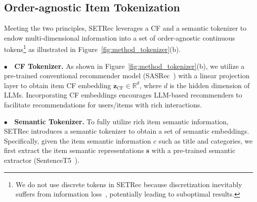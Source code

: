 \subsection{Order-agnostic Item Tokenization} 
Meeting the two principles, SETRec leverages a CF and a semantic tokenizer to endow multi-dimensional information into a set of order-agnostic continuous tokens\footnote{We do not use discrete tokens in SETRec because discretization inevitably suffers from information loss~\cite{lazebnik2008supervised}, potentially leading to suboptimal results.} as illustrated in Figure~\ref{fig:method_tokenizer}(b). 

\noindent$\bullet\quad$\textbf{CF Tokenizer.}
As shown in Figure~\ref{fig:method_tokenizer}(b), we utilize a pre-trained conventional recommender model (\eg SASRec~\cite{lazebnik2008supervised}) with a linear projection layer to obtain item CF embedding $\bm{z}_{\text{CF}}\in\mathbb{R}^{d}$, where $d$ is the hidden dimension of LLMs. 
Incorporating CF embeddings encourages LLM-based recommenders to facilitate recommendations for users/items with rich interactions. 

\noindent$\bullet\quad$\textbf{Semantic Tokenizer.} 
To fully utilize rich item semantic information, SETRec introduces a semantic tokenizer to obtain a set of semantic embeddings. 
Specifically, 
given the item semantic information $c$ such as title and categories, we first extract the item semantic representations $\bm{s}$ with a pre-trained semantic extractor (\eg SentenceT5~\cite{ni2021sentence}). 

